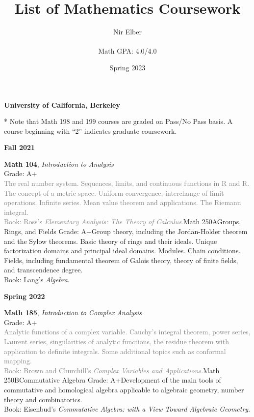 \documentclass{article}
\title{List of Mathematics Coursework}
\author{Nir Elber \\\\ Math GPA: 4.0/4.0}
\date{Spring 2023}
\renewcommand{\section}[1]{{\color{headercolor}\LARGE
    \textbf{#1\phantom{p}}}}
\renewcommand{\subsection}[1]{{\color{headercolor}\Large
    \textbf{#1\phantom{p}}}}
\newcommand{\entry}[5]{{\large\textbf{#1}, \textit{#2}}\\
    #3\hfill\\
    \textcolor{gray}{#4}}
\begin{document}
\maketitle

\section{University of California, Berkeley}

* Note that Math 198 and 199 courses are graded on Pass/No Pass basis. A course beginning with ``2'' indicates graduate coursework.

\subsection{Fall 2021}

\entry{Math 104}{Introduction to Analysis}
{Grade: A+}{The real number system. Sequences, limits, and continuous functions in R and R. The concept of a metric space. Uniform convergence, interchange of limit operations. Infinite series. Mean value theorem and applications. The Riemann integral. \\
Book: Ross's \textit{Elementary Analysis: The Theory of Calculus}.}


\entry{Math 250A}{Groups, Rings, and Fields}
{Grade: A+}{Group theory, including the Jordan-Holder theorem and the Sylow theorems. Basic theory of rings and their ideals. Unique factorization domains and principal ideal domains. Modules. Chain conditions. Fields, including fundamental theorem of Galois theory, theory of finite fields, and transcendence degree. \\
Book: Lang's \textit{Algebra}.}


\subsection{Spring 2022}

\entry{Math 185}{Introduction to Complex Analysis}
{Grade: A+}{Analytic functions of a complex variable. Cauchy's integral theorem, power series, Laurent series, singularities of analytic functions, the residue theorem with application to definite integrals. Some additional topics such as conformal mapping. \\
Book: Brown and Churchill's \textit{Complex Variables and Applications}.}


\entry{Math 250B}{Commutative Algebra}
{Grade: A+}{Development of the main tools of commutative and homological algebra applicable to algebraic geometry, number theory and combinatorics. \\
Book: Eisenbud's \textit{Commutative Algebra: with a View Toward Algebraic Geometry}.}
\end{document}
